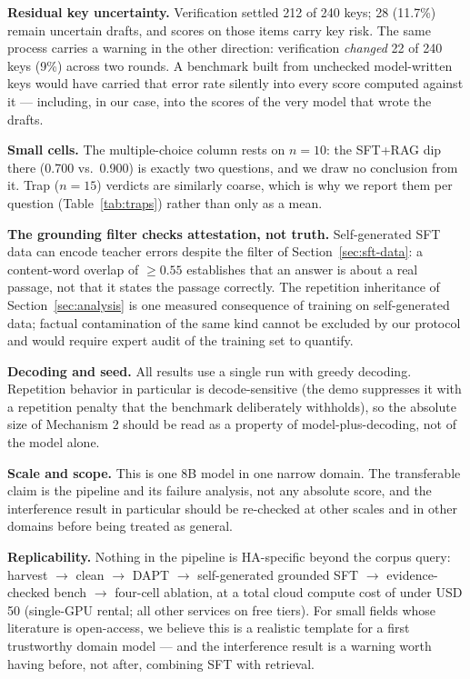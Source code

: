 \documentclass[11pt]{article}
\begin{document}
\textbf{Residual key uncertainty.} Verification settled 212 of 240 keys;
28 (11.7\%) remain uncertain drafts, and scores on those items carry key
risk. The same process carries a warning in the other direction:
verification \emph{changed} 22 of 240 keys (9\%) across two rounds. A
benchmark built from unchecked model-written keys would have carried that
error rate silently into every score computed against it --- including,
in our case, into the scores of the very model that wrote the drafts.

\textbf{Small cells.} The multiple-choice column rests on $n=10$: the
SFT+RAG dip there (0.700 vs.\ 0.900) is exactly two questions, and we draw
no conclusion from it. Trap ($n=15$) verdicts are similarly coarse, which
is why we report them per question (Table~\ref{tab:traps}) rather than
only as a mean.

\textbf{The grounding filter checks attestation, not truth.}
Self-generated SFT data can encode teacher errors despite the filter of
Section~\ref{sec:sft-data}: a content-word overlap of $\geq 0.55$
establishes that an answer is about a real passage, not that it states
the passage correctly. The repetition inheritance of
Section~\ref{sec:analysis} is one measured consequence of training on
self-generated data; factual contamination of the same kind cannot be
excluded by our protocol and would require expert audit of the training
set to quantify.

\textbf{Decoding and seed.} All results use a single run with greedy
decoding. Repetition behavior in particular is decode-sensitive (the demo
suppresses it with a repetition penalty that the benchmark deliberately
withholds), so the absolute size of Mechanism 2 should be read as a
property of model-plus-decoding, not of the model alone.

\textbf{Scale and scope.} This is one 8B model in one narrow domain. The
transferable claim is the pipeline and its failure analysis, not any
absolute score, and the interference result in particular should be
re-checked at other scales and in other domains before being treated as
general.

\textbf{Replicability.} Nothing in the pipeline is HA-specific beyond the
corpus query: harvest $\rightarrow$ clean $\rightarrow$ DAPT $\rightarrow$
self-generated grounded SFT $\rightarrow$ evidence-checked bench
$\rightarrow$ four-cell ablation, at a total cloud compute cost of under
USD 50 (single-GPU rental; all other services on free tiers). For small
fields whose literature is open-access, we believe this is a realistic
template for a first trustworthy domain model --- and the interference
result is a warning worth having before, not after, combining SFT with
retrieval.
\end{document}
